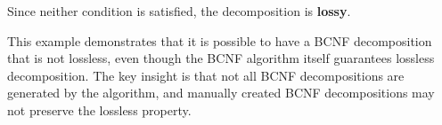 \documentclass[12pt,a4paper]{article}
\begin{document}
Since neither condition is satisfied, the decomposition is \textbf{lossy}.

This example demonstrates that it is possible to have a BCNF decomposition that is not lossless, even though the BCNF algorithm itself guarantees lossless decomposition. The key insight is that not all BCNF decompositions are generated by the algorithm, and manually created BCNF decompositions may not preserve the lossless property.
\end{document}
